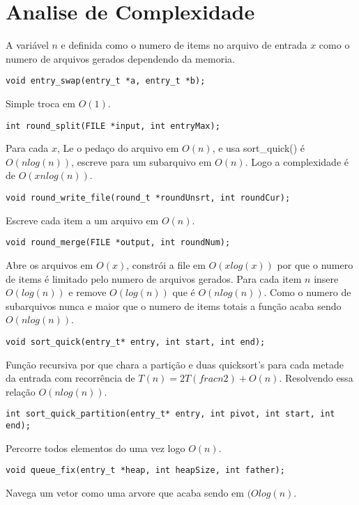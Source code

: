 \documentclass[a4paper, 11pt]{article}
\begin{document}
\section{Analise de Complexidade}
A variável $n$ e definida como o numero de items no arquivo de entrada $x$ como o numero de arquivos gerados dependendo da memoria.

\begin{verbatim}
void entry_swap(entry_t *a, entry_t *b);
\end{verbatim}
Simple troca em $O(1)$.

\begin{verbatim}
int round_split(FILE *input, int entryMax);
\end{verbatim}
Para cada $x$, Le o pedaço do arquivo em $O(n)$, e usa sort\_quick() é $O(nlog(n))$, escreve para um subarquivo em $O(n)$. Logo a complexidade é de $O(xnlog(n))$.

\begin{verbatim}
void round_write_file(round_t *roundUnsrt, int roundCur);
\end{verbatim}
Escreve cada item a um arquivo em $O(n)$.

\begin{verbatim}
void round_merge(FILE *output, int roundNum);
\end{verbatim}
Abre os arquivos em $O(x)$, constrói a file em $O(xlog(x))$ por que o numero de items é limitado pelo numero de arquivos gerados. Para cada item $n$ insere $O(log(n))$ e remove $O(log(n))$ que é $O(nlog(n))$. Como o numero de subarquivos nunca e maior que o numero de items totais a função acaba sendo $O(nlog(n))$.

\begin{verbatim}
void sort_quick(entry_t* entry, int start, int end);
\end{verbatim}
Função recursiva por que chara a partição e duas quicksort's para cada metade da entrada com recorrência de $T(n) = 2T(frac{n}{2}) + O(n)$. Resolvendo essa relação $O(nlog(n))$.

\begin{verbatim}
int sort_quick_partition(entry_t* entry, int pivot, int start, int end);
\end{verbatim}
Percorre todos elementos do uma vez logo $O(n)$.

\begin{verbatim}
void queue_fix(entry_t *heap, int heapSize, int father);
\end{verbatim}
Navega um vetor como uma arvore que acaba sendo em $(Olog(n)$.
\end{document}
